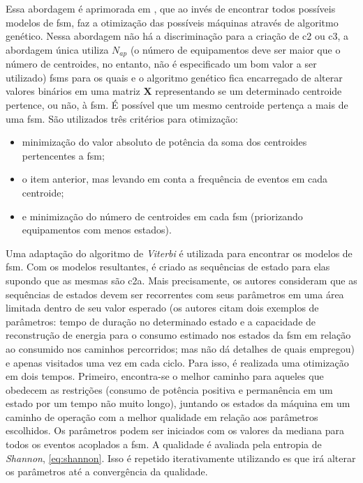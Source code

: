 \begin{enumerate}[label=\textbf{1.\arabic*},wide=\parindent]
\begin{enumerate}[label*=.\textbf{\arabic*},wide=\parindent]
\begin{itemize}[wide=\parindent]
Essa abordagem é aprimorada em
\cite{nilm_baranski_genetic_detalhado_2004_20,nilm_baranski_summary_2004_21},
que ao invés de encontrar todos possíveis modelos de \gls{fsm},
faz a otimização das possíveis máquinas através de algoritmo genético.
Nessa abordagem não há a discriminação para a criação de \gls{c2} ou
\gls{c3}, a abordagem única utiliza $N_{ap}$ (o número de equipamentos
deve ser maior que o número de centroides, no entanto, não é
especificado um bom valor a ser utilizado) \glspl{fsm} para os quais e o
algoritmo genético fica encarregado de alterar valores binários em uma
matriz $\mathbf{X}$ representando se um determinado centroide
pertence, ou não, à \gls{fsm}. É possível que um mesmo centroide
pertença a mais de uma \gls{fsm}. São utilizados três critérios para
otimização: 

\begin{itemize}
\item minimização do valor absoluto de potência da soma dos
centroides pertencentes a \gls{fsm}; 
\item o item anterior, mas levando em conta a frequência de
eventos em cada centroide; 
\item e minimização do número de centroides em
cada \gls{fsm} (priorizando equipamentos com menos estados).
\end{itemize}

Uma adaptação do algoritmo de \emph{Viterbi} é utilizada para encontrar os
modelos de \gls{fsm}. Com os modelos resultantes, é criado as
sequências de estado para elas supondo que as mesmas são \gls{c2a}.
Mais precisamente, os autores consideram que as sequências de estados
devem ser recorrentes com seus parâmetros em uma área limitada dentro
de seu valor esperado (os autores citam dois exemplos de parâmetros:
tempo de duração no determinado estado e a capacidade de reconstrução
de energia para o consumo estimado nos estados da \gls{fsm} em relação
ao consumido nos caminhos percorridos; mas não dá detalhes de quais
empregou) e apenas visitados uma vez em cada ciclo. Para isso, é
realizada uma otimização em dois tempos. Primeiro, encontra-se o
melhor caminho para aqueles que obedecem as restrições (consumo de
potência positiva e permanência em um estado por um tempo não muito
longo), juntando os estados da máquina em um caminho de operação com a
melhor qualidade em relação aos parâmetros escolhidos. Os parâmetros
podem ser iniciados com os valores da mediana para todos os eventos
acoplados a \gls{fsm}. A qualidade é avaliada pela entropia de
\emph{Shannon}, \ref{eq:shannon}. Isso é repetido iterativamente
utilizando \gls{es} que irá alterar os parâmetros até a convergência
da qualidade.


\end{itemize}
\end{enumerate}
\end{enumerate}
